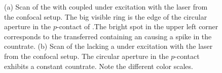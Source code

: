 	\begin{figure}[!htb]
		\begin{subfigure}[t]{ 0.49\linewidth}
			\centering
			\caption{}
			\label{subfig::vcsel_confocal_laser_excitation_with_diamond}
		\end{subfigure}
		\hfill
		\begin{subfigure}[t]{ 0.49\linewidth}
			\centering
			\caption{}
			\label{subfig::confocal_laser_excitation_without_diamond}
		\end{subfigure}
		\caption[Scans of \VCSELs with and without \siv]{(a) Scan of the \BmFour with coupled \nd under excitation with the laser from the confocal setup. The big visible ring is the edge of the circular aperture in the $p$-contact of \BmFour.The bright spot in the upper left corner corresponds to the transferred \nd containing an \siv causing a spike in the countrate. (b) Scan of the \BmTwo lacking a \nd under excitation with the laser from the confocal setup. The circular aperture in the $p$-contact exhibits a constant countrate. Note the different color scales.}
	\end{figure}

